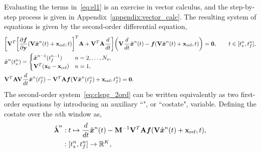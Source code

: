 Evaluating the terms in~\eqref{eq:el1} is an exercise in
vector calculus, and the step-by-step process is given in
Appendix~\ref{appendix:vector_calc}. The resulting system of equations is
given by the second-order differential equation,
\begin{equation}\label{eq:clspg_2ord}
\begin{split} 
&\bigg[\basisspace^T \bigg[\frac{\partial
\velocity}{\partial \stateyDiscreteArgnt{}} (\basisspace \genstateArg{n}{t} +
\stateIntercept,t)\bigg]^T \stweightingMatArgt{n}{t} + \basisspace^T
\stweightingMatArgt{n}{t} \frac{d}{dt} \bigg] \bigg(  \basisspace
\frac{d}{dt}\genstateArg{n}{t}   -  \velocity(\veloargsromn) \bigg) = \bz, \qquad t \in  [\timeStartArg{n},\timeEndArg{n}],
\\
&\genstate^n( \timeStartArg{n})  = \begin{cases}
\genstate^{n-1}(\timeEndArg{n-1}) & n=2,\ldots,\nslabs, \\
\basisspace^T(\stateFOMIC - \stateIntercept) & n=1, \end{cases}\\ 
& 
\basisspace^T \stweightingMatArgt{n}{\timeEndArg{n}} \basisspace \frac{d}{dt}\genstateArg{n}{\timeEndArg{n}}  -
\basisspace^T \stweightingMatArgt{n}{\timeEndArg{n}}
\velocity(\basisspace \genstateArg{n}{\timeEndArg{n}} + \stateIntercept,\timeEndArg{n}) = \bz.  
\end{split}
\end{equation}
The second-order system~\eqref{eq:clspg_2ord} can be written equivalently as two first-order
equations by introducing an auxiliary ``\adjointStr", or ``costate", variable. %
Defining the costate over the $n$th window as, 
\begin{equation}\label{eq:costate_def}
\begin{split}
\adjointArgnt{n} &: t \mapsto \frac{d}{dt}\genstateArg{n}{t}  -  \mass^{-1} \basisspace^T \stweightingMatArgt{n}{t}\velocity(\veloargsromn) ,\\
&: [\timeStartArg{n},\timeEndArg{n}] \rightarrow \RR{K} ,
\end{split}
\end{equation}

